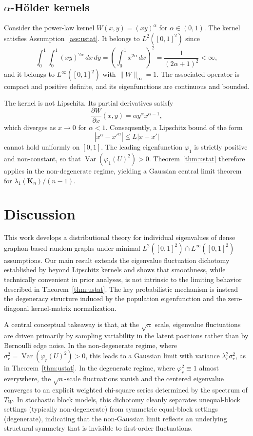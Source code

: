 \documentclass[11pt]{article}
\theoremstyle{plain}
\theoremstyle{remark}
\DeclareMathOperator{\Var}{Var}
\begin{document}
\subsection{\texorpdfstring{$\alpha$-H\"older kernels}{alpha-Holder kernels}}

Consider the power-law kernel $W(x,y)=(xy)^\alpha$ for $\alpha\in(0,1)$. The kernel satisfies Assumption~\ref{ass:ustat}. It belongs to $L^2([0,1]^2)$ since
\[
\int_0^1\int_0^1(xy)^{2\alpha}\,dx\,dy
=
\left(\int_0^1 x^{2\alpha}\,dx\right)^2
=
\frac{1}{(2\alpha+1)^2}<\infty,
\]
and it belongs to $L^\infty([0,1]^2)$ with $\|W\|_\infty=1$. The associated operator is compact and positive definite, and its eigenfunctions are continuous and bounded.

The kernel is not Lipschitz. Its partial derivatives satisfy
\[
\frac{\partial W}{\partial x}(x,y)=\alpha y^\alpha x^{\alpha-1},
\]
which diverges as $x\to0$ for $\alpha<1$. Consequently, a Lipschitz bound of the form
\[
|x^\alpha-x'^\alpha|\le L|x-x'|
\]
cannot hold uniformly on $[0,1]$. The leading eigenfunction $\varphi_1$ is strictly positive and non-constant, so that $\Var(\varphi_1(U)^2)>0$. Theorem~\ref{thm:ustat} therefore applies in the non-degenerate regime, yielding a Gaussian central limit theorem for $\lambda_1(\mathbf{K}_n)/(n-1)$.


\section{Discussion}
\label{sec:discussion}

This work develops a distributional theory for individual eigenvalues of dense graphon-based random graphs under minimal $L^2([0,1]^2) \cap L^\infty ([0,1]^2)$ assumptions. Our main result extends the eigenvalue fluctuation dichotomy established by \citet{chatterjee2025fluctuation} beyond Lipschitz kernels and shows that smoothness, while technically convenient in prior analyses, is not intrinsic to the limiting behavior described in Theorem~\ref{thm:ustat}. The key probabilistic mechanism is instead the degeneracy structure induced by the population eigenfunction and the zero-diagonal kernel-matrix normalization.

A central conceptual takeaway is that, at the $\sqrt{n}$ scale, eigenvalue fluctuations are driven primarily by sampling variability in the latent positions rather than by Bernoulli edge noise. In the non-degenerate regime, where $\sigma_r^2=\Var(\varphi_r(U)^2)>0$, this leads to a Gaussian limit with variance $\lambda_r^2\sigma_r^2$, as in Theorem~\ref{thm:ustat}. In the degenerate regime, where $\varphi_r^2\equiv 1$ almost everywhere, the $\sqrt{n}$-scale fluctuations vanish and the centered eigenvalue converges to an explicit weighted chi-square series determined by the spectrum of $T_W$. In stochastic block models, this dichotomy cleanly separates unequal-block settings (typically non-degenerate) from symmetric equal-block settings (degenerate), indicating that the non-Gaussian limit reflects an underlying structural symmetry that is invisible to first-order fluctuations.
\end{document}
